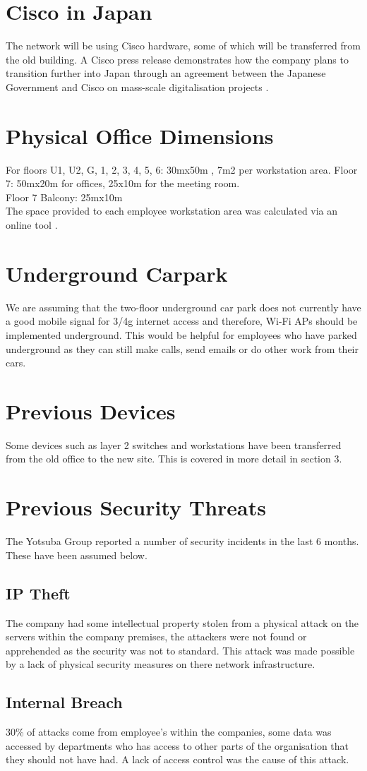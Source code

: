 \section{Cisco in Japan}
The network will be using Cisco hardware, some of which will be transferred from the old 
building. A Cisco press release demonstrates how the company plans to transition further into Japan through an agreement between the Japanese Government and Cisco on mass-scale digitalisation projects \parencite{cisco-japan}.
\section{Physical Office Dimensions}
For floors U1, U2, G, 1, 2, 3, 4, 5, 6: 30mx50m , 7m2 per workstation area.
Floor 7: 50mx20m for offices, 25x10m for the meeting room. \\
Floor 7 Balcony: 25mx10m \\
The space provided to each employee workstation area was calculated via an online tool \parencite{floor-space}.
\section{Underground Carpark}
We are assuming that the two-floor underground car park does not currently have a good mobile signal for 3/4g internet access and therefore, Wi-Fi APs should be implemented underground. This  would be helpful for employees who have parked underground as they can still make calls, send emails or do other work from their cars.
\section{Previous Devices}
Some devices such as layer 2 switches and workstations have been transferred from the old office to the new site. This is covered in more detail in section 3. 
\section{Previous Security Threats}
The Yotsuba Group reported a number of security incidents in the last 6 months. These have been assumed below.
\subsection{IP Theft}
The company had some intellectual property stolen from a physical attack on the servers within the company premises, the attackers were not found or apprehended as the security was not to standard. This attack was made possible by a lack of physical security measures on there network infrastructure.
\subsection{Internal Breach}
30\% of attacks come from employee's within the companies, some data was accessed by departments who has access to other parts of the organisation that they should not have had. A lack of access control was the cause of this attack.
